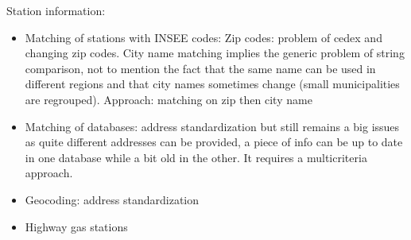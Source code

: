 \documentclass[11pt]{article}
\begin{document}
Station information:
\begin{itemize}
\item Matching of stations with INSEE codes: Zip codes: problem of cedex and changing zip codes. City name matching implies the generic problem of string comparison, not to mention the fact that the same name can be used in different regions and that city names sometimes change (small municipalities are regrouped). Approach: matching on zip then city name
\item Matching of databases: address standardization but still remains a big issues as quite different addresses can be provided, a piece of info can be up to date in one database while a bit old in the other. It requires a multicriteria approach.
\item Geocoding: address standardization
\item Highway gas stations
\end{itemize}
\end{document}
